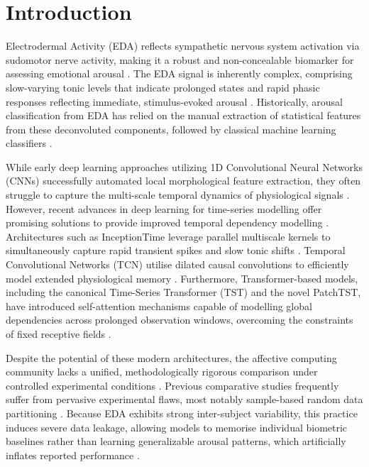 \documentclass[runningheads]{llncs}
\begin{document}
\section{Introduction}

Electrodermal Activity (EDA) reflects sympathetic nervous system activation via sudomotor nerve activity, making it a robust and non-concealable biomarker for assessing emotional arousal \cite{Hossain2024,Meijer2023}. The EDA signal is inherently complex, comprising slow-varying tonic levels that indicate prolonged states and rapid phasic responses reflecting immediate, stimulus-evoked arousal \cite{sanchez2020deep}. Historically, arousal classification from EDA has relied on the manual extraction of statistical features from these deconvoluted components, followed by classical machine learning classifiers \cite{SanchezReolid2022}. 

While early deep learning approaches utilizing 1D Convolutional Neural Networks (CNNs) successfully automated local morphological feature extraction, they often struggle to capture the multi-scale temporal dynamics of physiological signals \cite{sanchez2022one,Liu2025}. However, recent advances in deep learning for time-series modelling offer promising solutions to provide improved temporal dependency modelling \cite{Azad2025}. Architectures such as InceptionTime leverage parallel multiscale kernels to simultaneously capture rapid transient spikes and slow tonic shifts \cite{InceptionTime2020,Sun2025}. Temporal Convolutional Networks (TCN) utilise dilated causal convolutions to efficiently model extended physiological memory \cite{Luo2024}. Furthermore, Transformer-based models, including the canonical Time-Series Transformer (TST) and the novel PatchTST, have introduced self-attention mechanisms capable of modelling global dependencies across prolonged observation windows, overcoming the constraints of fixed receptive fields \cite{Tsirmpas2025,Wang2024,Kim2024}.

Despite the potential of these modern architectures, the affective computing community lacks a unified, methodologically rigorous comparison under controlled experimental conditions \cite{SanchezReolid2022,portal2025performance}. Previous comparative studies frequently suffer from pervasive experimental flaws, most notably sample-based random data partitioning \cite{Azad2025}. Because EDA exhibits strong inter-subject variability, this practice induces severe data leakage, allowing models to memorise individual biometric baselines rather than learning generalizable arousal patterns, which artificially inflates reported performance \cite{Azad2025,LongTermVariability}.
\end{document}
